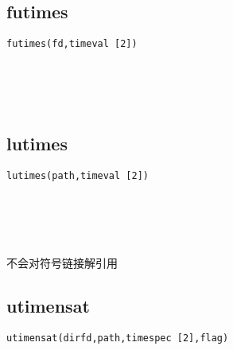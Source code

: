 \documentclass[10pt,a4paper]{article}
\begin{document}
\subsection{futimes}
\begin{spacing}{2.0}
\lstset{language=C,numbers=none}
\begin{lstlisting}
futimes(fd,timeval [2])
\end{lstlisting}
{\large\color[rgb]{0.2,0.4,0.6}{fd:}} \\
{\large\color[rgb]{0.2,0.4,0.6}{[2]:}}
\paragraph{ \ \ }
\end{spacing}

\subsection{lutimes}
\begin{spacing}{2.0}
\lstset{language=C,numbers=none}
\begin{lstlisting}
lutimes(path,timeval [2])
\end{lstlisting}
{\large\color[rgb]{0.2,0.4,0.6}{path:}} \\
{\large\color[rgb]{0.2,0.4,0.6}{[2]:}}
\paragraph{ \ \ }不会对符号链接解引用
\end{spacing}

\subsection{utimensat}
\begin{spacing}{2.0}
\lstset{language=C,numbers=none}
\begin{lstlisting}
utimensat(dirfd,path,timespec [2],flag)
\end{lstlisting}
{\large\color[rgb]{0.2,0.4,0.6}{dirfd:}} \\
{\large\color[rgb]{0.2,0.4,0.6}{path:}} \\
{\large\color[rgb]{0.2,0.4,0.6}{[2]:}} \\
{\large\color[rgb]{0.2,0.4,0.6}{flag:}}
\paragraph{ \ \ }
\end{spacing}
\end{document}
